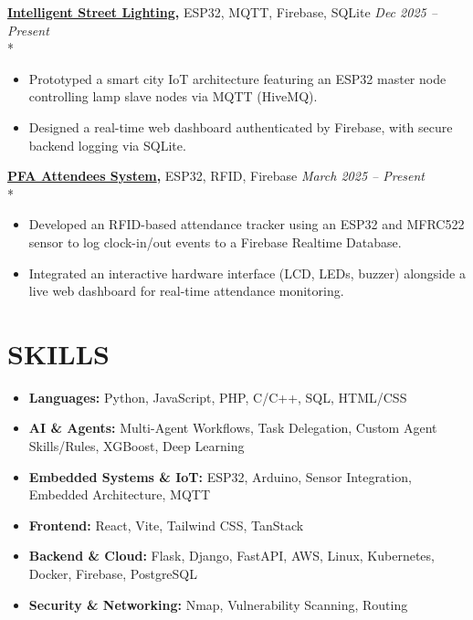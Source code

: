 \documentclass[10pt,letterpaper]{article}
\newcommand{\experienceItem}[4]{%
    \textbf{#1,} #2 \hfill \textit{#3 -- #4}\\*%
}
\begin{document}
\experienceItem{\href{https://github.com/Bechir-afk/Intelligent_Street_Lighting}{Intelligent Street Lighting}}{ESP32, MQTT, Firebase, SQLite}{Dec 2025}{Present}
\begin{itemize}[leftmargin=*, noitemsep, topsep=0pt]
    \item Prototyped a smart city IoT architecture featuring an ESP32 master node controlling lamp slave nodes via MQTT (HiveMQ).
    \item Designed a real-time web dashboard authenticated by Firebase, with secure backend logging via SQLite.
\end{itemize}
\vspace{4pt}

\experienceItem{\href{https://github.com/Bechir-afk/PFA-Attandees-System}{PFA Attendees System}}{ESP32, RFID, Firebase}{March 2025}{Present}
\begin{itemize}[leftmargin=*, noitemsep, topsep=0pt]
    \item Developed an RFID-based attendance tracker using an ESP32 and MFRC522 sensor to log clock-in/out events to a Firebase Realtime Database.
    \item Integrated an interactive hardware interface (LCD, LEDs, buzzer) alongside a live web dashboard for real-time attendance monitoring.
\end{itemize}

\section*{SKILLS}

\begin{itemize}[leftmargin=*, noitemsep, topsep=0pt]
    \item \textbf{Languages:} Python, JavaScript, PHP, C/C++, SQL, HTML/CSS
    \item \textbf{AI \& Agents:} Multi-Agent Workflows, Task Delegation, Custom Agent Skills/Rules, XGBoost, Deep Learning
    \item \textbf{Embedded Systems \& IoT:} ESP32, Arduino, Sensor Integration, Embedded Architecture, MQTT
    \item \textbf{Frontend:} React, Vite, Tailwind CSS, TanStack
    \item \textbf{Backend \& Cloud:} Flask, Django, FastAPI, AWS, Linux, Kubernetes, Docker, Firebase, PostgreSQL
    \item \textbf{Security \& Networking:} Nmap, Vulnerability Scanning, Routing
\end{itemize}
\end{document}
